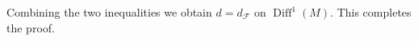 \documentclass[12pt]{amsart}
\numberwithin{equation}{section}
\theoremstyle{remark}
\begin{document}
Combining the two inequalities we obtain $d=d_{\mathcal F}$ on $\operatorname{Diff}^1(M)$. This completes the proof.







\end{document}
